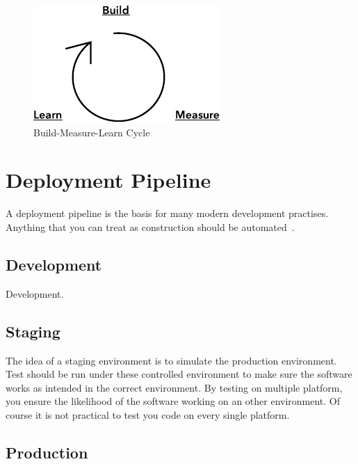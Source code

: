 \documentclass[english]{tktltiki2}
\begin{document}
\begin{figure}[h!]

    \vspace{1cm}
    \centering

    \includegraphics{figures/build-measure-learn}

    \caption{Build-Measure-Learn Cycle}
    \label{figure:build-measure-learn}

\end{figure}


\section{Deployment Pipeline}

A deployment pipeline is the basis for many modern development practises. Anything that you can treat as construction should be automated~\cite{Fow05}.

\subsection{Development}

Development.

\subsection{Staging}

The idea of a staging environment is to simulate the production environment. Test should be run under these controlled environment to make sure the software works as intended in the correct environment. By testing on multiple platform, you ensure the likelihood of the software working on an other environment. Of course it is not practical to test you code on every single platform.

\subsection{Production}
\end{document}

